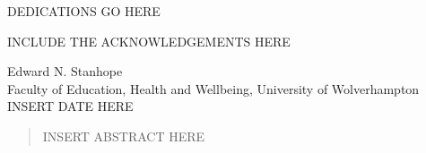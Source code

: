 \documentclass[a4paper, twoside]{templates/ociamthesis}
\begin{document}
\begin{romanpages}

\maketitle

\begin{dedication}
  DEDICATIONS GO HERE
\end{dedication}

\begin{acknowledgements}
 	INCLUDE THE ACKNOWLEDGEMENTS HERE

\begin{flushright}
Edward N. Stanhope \\
Faculty of Education, Health and Wellbeing, University of Wolverhampton \\
INSERT DATE HERE
\end{flushright}
\end{acknowledgements}


\begin{abstract}
	INSERT ABSTRACT HERE
\end{abstract}

  \dominitoc %
  \dominilof  %
  \dominilot  %

\flushbottom

\tableofcontents

\listoffigures
	\mtcaddchapter

\listoftables
  \mtcaddchapter


\end{romanpages}
\end{document}
